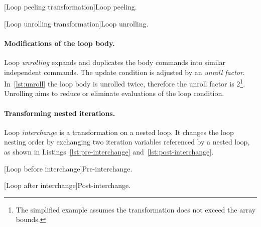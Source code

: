 \begin{center}
\begin{minipage}{\textwidth}
\begin{minipage}[t]{.45\textwidth}
[Loop peeling transformation]{Loop peeling.}
\label{lst:peel}
\end{minipage}\hfill%
\begin{minipage}[t]{.45\textwidth}
[Loop unrolling transformation]{Loop unrolling.}
\label{lst:unroll}
\end{minipage}
\end{minipage}
\end{center}

\paragraph*{Modifications of the loop body.}
Loop \emph{unrolling} expands and duplicates the body commands into similar independent commands.
The update condition is adjusted by an \emph{unroll factor}.
In~\autoref{lst:unroll} the loop body is unrolled twice, therefore the unroll factor is 2\footnote{
The simplified example assumes the transformation does not exceed the array bounds.}.
Unrolling aims to reduce or eliminate evaluations of the loop condition.

\paragraph*{Transforming nested iterations.}

Loop \emph{interchange} is a transformation on a nested loop.
It changes the loop nesting order by exchanging two iteration variables referenced by a nested loop,
as shown in Listings~\ref{lst:pre-interchange} and~\ref{lst:post-interchange}.

\begin{center}
\begin{minipage}{\textwidth}
\begin{minipage}[t]{.45\textwidth}
[Loop before interchange]{Pre-interchange.}
\label{lst:pre-interchange}
\end{minipage}\hfill%
\begin{minipage}[t]{.45\textwidth}
[Loop after interchange]{Post-interchange.}
\label{lst:post-interchange}
\end{minipage}
\end{minipage}
\end{center}

